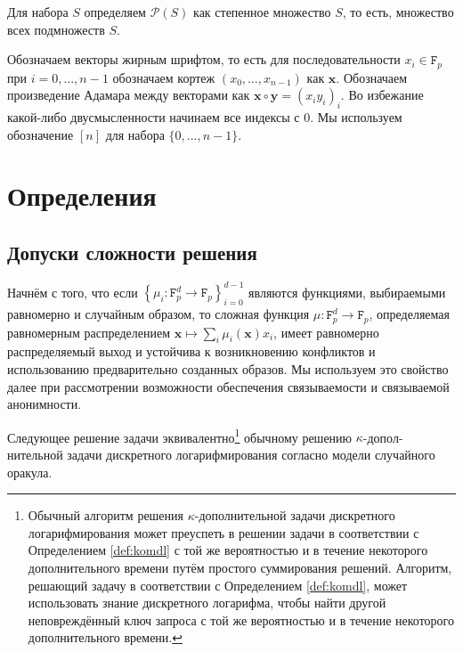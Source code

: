 \documentclass{llncs}
\newcommand{\F}{\texttt{F}_p}
\begin{document}
Для набора $S$ определяем $\mathcal{P}(S)$ как степенное множество $S$, то есть, множество всех подмножеств $S$.

Обозначаем векторы жирным шрифтом, то есть для последовательности $x_i \in \F$ при $i = 0, \ldots, n-1$ обозначаем кортеж $(x_0, \ldots, x_{n-1})$ как $\textbf{x}$. Обозначаем произведение Адамара между векторами как $\textbf{x} \circ \textbf{y} = (x_i y_i)_i$. Во избежание какой-либо двусмысленности начинаем все индексы с $0$. Мы используем обозначение $[n]$ для набора $\{0,\ldots,n-1\}$.


\section{Определения}

\subsection{Допуски сложности решения}\label{sec:hardness}

Начнём с того, что если $\left\{\mu_i: \F^d \to \F\right\}_{i=0}^{d-1}$ являются функциями, выбираемыми равномерно и случайным образом, то сложная функция $\mu: \F^d \to \F$, определяемая равномерным распределением $\textbf{x} \mapsto \sum_i \mu_i(\textbf{x}) x_i$, имеет равномерно распределяемый выход и устойчива к возникновению конфликтов и использованию предварительно созданных образов. Мы используем это свойство далее при рассмотрении возможности обеспечения связываемости и связываемой анонимности.

Следующее решение задачи эквивалентно\footnote{Обычный алгоритм решения $\kappa$-дополнительной задачи дискретного логарифмирования может преуспеть в решении задачи в соответствии с Определением \ref{def:komdl} с той же вероятностью и в течение некоторого дополнительного времени путём простого суммирования решений. Алгоритм, решающий задачу в соответствии с Определением \ref{def:komdl}, может использовать знание дискретного логарифма, чтобы найти другой неповреждённый ключ запроса с той же вероятностью и в течение некоторого дополнительного времени.} обычному решению $\kappa$-допол- \linebreak нительной задачи дискретного логарифмирования согласно модели случайного оракула.
\end{document}

